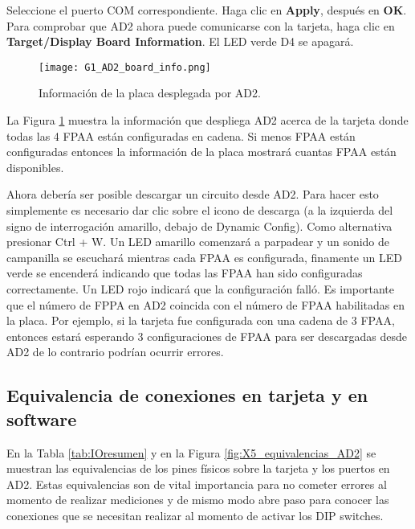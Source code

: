 	Seleccione el puerto COM correspondiente. Haga clic en \textbf{Apply}, después en \textbf{OK}. Para comprobar que AD2 ahora puede comunicarse con la tarjeta, haga clic en \textbf{Target/Display Board Information}. El LED verde D4 se apagará.

	\begin{figure}[hbtp]
		\caption{Información de la placa desplegada por AD2.}
		\label{fig:G1_AD2_board_info}
		\centering
		\texttt{[image: G1\_AD2\_board\_info.png]}
	\end{figure}
	
	La Figura \ref{fig:G1_AD2_board_info} muestra la información que despliega AD2 acerca de la tarjeta donde todas las 4 FPAA están configuradas en cadena. Si menos FPAA están configuradas entonces la información de la placa mostrará cuantas FPAA están disponibles.

	Ahora debería ser posible descargar un circuito desde AD2. Para hacer esto simplemente es necesario dar clic sobre el icono de descarga (a la izquierda del signo de interrogación amarillo, debajo de Dynamic Config). Como alternativa presionar Ctrl + W. Un LED amarillo comenzará a parpadear y un sonido de campanilla se escuchará mientras cada FPAA es configurada, finamente un LED verde se encenderá indicando que todas las FPAA han sido configuradas correctamente. Un LED rojo indicará que la configuración falló. Es importante que el número de FPPA en AD2 coincida con el número de FPAA habilitadas en la placa. Por ejemplo, si la tarjeta fue configurada con una cadena de 3 FPAA, entonces estará esperando 3 configuraciones de FPAA para ser descargadas desde AD2 de lo contrario podrían ocurrir errores.
	
		\subsection{Equivalencia de conexiones en tarjeta y en software}
		
	En la Tabla \ref{tab:IOresumen} y en la Figura \ref{fig:X5_equivalencias_AD2} se muestran las equivalencias de los pines físicos sobre la tarjeta y los puertos en AD2. Estas equivalencias son de vital importancia para no cometer errores al momento de realizar mediciones y de mismo modo abre paso para conocer las conexiones que se necesitan realizar al momento de activar los DIP switches.
		
